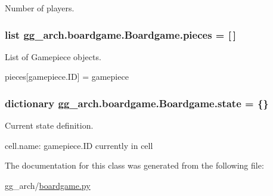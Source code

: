 Number of players. 

\hypertarget{classgg__arch_1_1boardgame_1_1_boardgame_a7425432d37ef9f90d9cc187f972c2052}{
\subsubsection[{pieces}]{\setlength{\rightskip}{0pt plus 5cm}list gg\-\_\-arch.\-boardgame.\-Boardgame.\-pieces = \mbox{[}$\,$\mbox{]}\hspace{0.3cm}{\ttfamily [static]}}}\label{classgg__arch_1_1boardgame_1_1_boardgame_a7425432d37ef9f90d9cc187f972c2052}


List of Gamepiece objects. 

pieces\mbox{[}gamepiece.\-I\-D\mbox{]} = gamepiece \hypertarget{classgg__arch_1_1boardgame_1_1_boardgame_a16f3034f66bd2ced22229b5798b8facc}{
\subsubsection[{state}]{\setlength{\rightskip}{0pt plus 5cm}dictionary gg\-\_\-arch.\-boardgame.\-Boardgame.\-state = \{\}\hspace{0.3cm}{\ttfamily [static]}}}\label{classgg__arch_1_1boardgame_1_1_boardgame_a16f3034f66bd2ced22229b5798b8facc}


Current state definition. 

cell.\-name\-: gamepiece.\-I\-D currently in cell 

The documentation for this class was generated from the following file\-:\begin{DoxyCompactItemize}
\item 
gg\-\_\-arch/\hyperlink{boardgame_8py}{boardgame.\-py}\end{DoxyCompactItemize}
